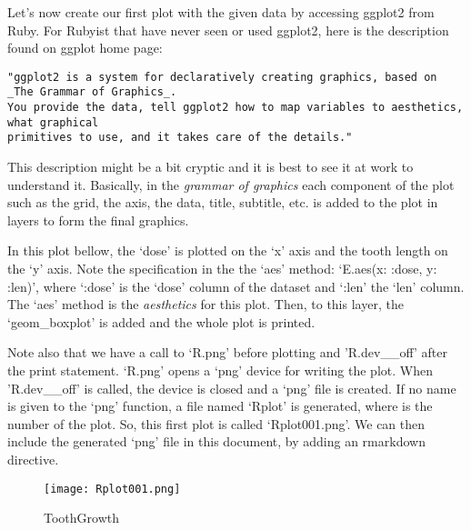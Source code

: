 \documentclass[]{article}
\newenvironment{Shaded}{\begin{snugshade}}{\end{snugshade}}
\newcommand{\DataTypeTok}[1]{\textcolor[rgb]{0.13,0.29,0.53}{#1}}
\newcommand{\StringTok}[1]{\textcolor[rgb]{0.31,0.60,0.02}{#1}}
\newcommand{\NormalTok}[1]{#1}
\begin{document}
Let's now create our first plot with the given data by accessing ggplot2
from Ruby. For Rubyist that have never seen or used ggplot2, here is the
description found on ggplot home page:

\begin{verbatim}
"ggplot2 is a system for declaratively creating graphics, based on _The Grammar of Graphics_.
You provide the data, tell ggplot2 how to map variables to aesthetics, what graphical 
primitives to use, and it takes care of the details."
\end{verbatim}

This description might be a bit cryptic and it is best to see it at work
to understand it. Basically, in the \emph{grammar of graphics} each
component of the plot such as the grid, the axis, the data, title,
subtitle, etc. is added to the plot in layers to form the final
graphics.

In this plot bellow, the `dose' is plotted on the `x' axis and the tooth
length on the `y' axis. Note the specification in the the `aes' method:
`E.aes(x: :dose, y: :len)', where `:dose' is the `dose' column of the
dataset and `:len' the `len' column. The `aes' method is the
\emph{aesthetics} for this plot. Then, to this layer, the
`geom\_boxplot' is added and the whole plot is printed.

Note also that we have a call to `R.png' before plotting and
'R.dev\_\_off' after the print statement. `R.png' opens a `png' device
for writing the plot. When 'R.dev\_\_off' is called, the device is
closed and a `png' file is created. If no name is given to the `png'
function, a file named `Rplot' is generated, where is the number of the
plot. So, this first plot is called `Rplot001.png'. We can then include
the generated `png' file in this document, by adding an rmarkdown
directive.

\begin{Shaded}
\end{Shaded}

\begin{figure}
\centering
\texttt{[image: Rplot001.png]}
\caption{ToothGrowth}
\end{figure}
\end{document}
